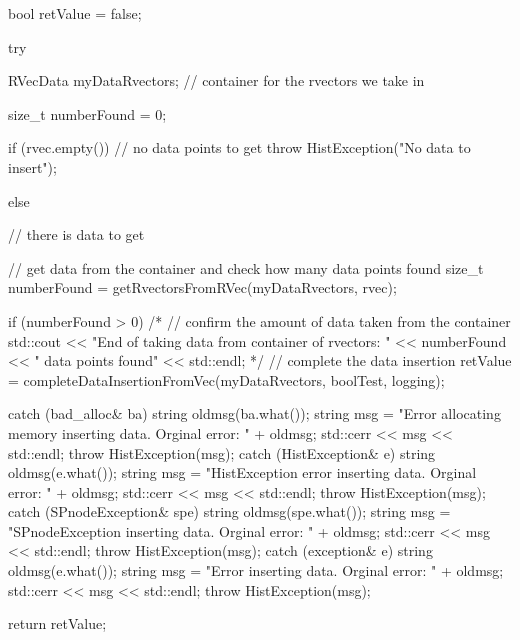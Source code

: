 \begin{DoxyCode}
{
    bool retValue = false;

    try {

        RVecData myDataRvectors; // container for the rvectors we take in

        size_t numberFound = 0;

        if (rvec.empty()) { // no data points to get
            throw HistException("No data to insert");
        }

        else { // there is data to get

            // get data from the container and check how many data points found
            size_t numberFound = getRvectorsFromRVec(myDataRvectors, rvec);


            if (numberFound > 0) {
                /*
                // confirm the amount of data taken from the container
                std::cout << "End of taking data from container of rvectors: "
                    << numberFound << " data points found" << std::endl;
                */
                // complete the data insertion
                retValue = completeDataInsertionFromVec(myDataRvectors,
                                                        boolTest, logging);
            }
        }
    }
    catch (bad_alloc& ba) {
         string oldmsg(ba.what());
        string msg = "Error allocating memory inserting data.  Orginal error: "
                                            + oldmsg;
        std::cerr << msg << std::endl;
        throw HistException(msg);
    }
    catch (HistException& e) {
        string oldmsg(e.what());
        string msg = "HistException error inserting data.  Orginal error: "
                                    + oldmsg;
        std::cerr << msg << std::endl;
        throw HistException(msg);
    }
    catch (SPnodeException& spe) {
        string oldmsg(spe.what());
        string msg = "SPnodeException inserting data.  Orginal error: " + 
      oldmsg;
        std::cerr << msg << std::endl;
        throw HistException(msg);
    }
    catch (exception& e) {
        string oldmsg(e.what());
        string msg = "Error inserting data.  Orginal error: " + oldmsg;
        std::cerr << msg << std::endl;
        throw HistException(msg);
    }

    return retValue;

}
\end{DoxyCode}
